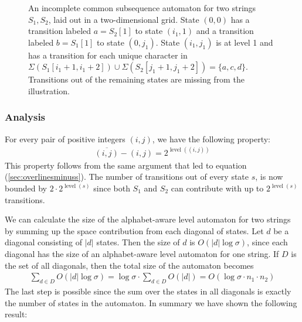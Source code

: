 \documentclass[a4paper,11pt]{article}
\DeclareMathOperator{\level}{level}
\begin{document}
\begin{figure}
\caption{\label{fig:simple2d} An incomplete common subsequence automaton for two strings $S_1,S_2$, laid out in a two-dimensional grid. State $(0,0)$ has a transition labeled $a=S_2[1]$ to state $(i_1, 1)$ and a transition labeled $b=S_1[1]$ to state $(0, j_1)$. State $(i_1, j_1)$ is at level 1 and has a transition for each unique character in $\Sigma(S_1[i_1+1, i_1+2]) \cup \Sigma(S_2[j_1+1, j_1+2])=\{a,c,d\}$. Transitions out of the remaining states are missing from the illustration.}
\end{figure}

\subsubsection{Analysis}

For every pair of positive integers $(i,j)$, we have the following property:
\begin{gather*}
\overline{(i,j)} - (i,j) = 2^{\level((i,j))}
\end{gather*}
This property follows from the same argument that led to equation (\ref{sec:overlinesminuss}). The number of transitions out of every state $s$, is now bounded by $2\cdot 2^{\level(s)}$ since both $S_1$ and $S_2$ can contribute with up to $2^{\level(s)}$ transitions.

We can calculate the size of the alphabet-aware level automaton for two strings by summing up the space contribution from each diagonal of states. Let $d$ be a diagonal consisting of $|d|$ states. Then the size of $d$ is $O(|d| \log \sigma)$, since each diagonal has the size of an alphabet-aware level automaton for one string. If $D$ is the set of all diagonals, then the total size of the automaton becomes
\begin{gather*}
\sum_{d\in D} O(|d|\log \sigma)=\log \sigma \cdot \sum_{d\in D} O(|d|)= O(\log \sigma \cdot  n_1 \cdot  n_2 )
\end{gather*}
The last step is possible since the sum over the states in all diagonals is exactly the number of states in the automaton. In summary we have shown the following result:
\end{document}
